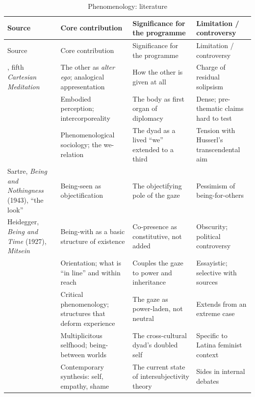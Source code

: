 \goldrule
\footnotesize
\begin{longtable}{Y Y Y Y}
\caption{Phenomenology: literature}\label{p07:tab:lit-phenom-frame}\\
\toprule
{}
Source & Core contribution & Significance for the programme & Limitation / controversy \\
\midrule
\endfirsthead
{}
Source & Core contribution & Significance for the programme & Limitation / controversy \\
\midrule
\endhead
\textcite{husserl1931cm}, fifth \emph{Cartesian Meditation} & The other as \emph{alter ego}; analogical appresentation & How the other is given at all & Charge of residual solipsism \\
\textcite{merleauponty1945} & Embodied perception; intercorporeality & The body as first organ of diplomacy & Dense; pre-thematic claims hard to test \\
\textcite{schutz1932} & Phenomenological sociology; the we-relation & The dyad as a lived ``we'' extended to a third & Tension with Husserl's transcendental aim \\
Sartre, \emph{Being and Nothingness} (1943), ``the look'' & Being-seen as objectification & The objectifying pole of the gaze & Pessimism of being-for-others \\
Heidegger, \emph{Being and Time} (1927), \emph{Mitsein} & Being-with as a basic structure of existence & Co-presence as constitutive, not added & Obscurity; political controversy \\
\textcite{ahmed2006queer} & Orientation; what is ``in line'' and within reach & Couples the gaze to power and inheritance & Essayistic; selective with sources \\
\textcite{guenther2013} & Critical phenomenology; structures that deform experience & The gaze as power-laden, not neutral & Extends from an extreme case \\
\textcite{ortega2016} & Multiplicitous selfhood; being-between worlds & The cross-cultural dyad's doubled self & Specific to Latina feminist context \\
\textcite{zahavi2014self} & Contemporary synthesis: self, empathy, shame & The current state of intersubjectivity theory & Sides in internal debates \\
\bottomrule
\end{longtable}

